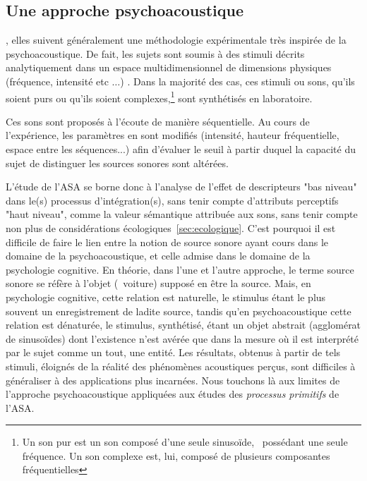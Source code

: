 \subsection{Une approche psychoacoustique}

, elles suivent généralement une méthodologie expérimentale très inspirée de la psychoacoustique. De fait, les sujets sont soumis à des stimuli décrits analytiquement dans un espace multidimensionnel de dimensions physiques (fréquence, intensité etc $\ldots$) \citep{dubois2006cognitive}. Dans la majorité des cas, ces stimuli ou sons, qu'ils soient purs ou qu'ils soient complexes,\footnote{Un son pur est un son composé d'une seule sinusoïde, \ie~possédant une seule fréquence. Un son complexe est, lui, composé de plusieurs composantes fréquentielles} sont synthétisés en laboratoire.

Ces sons sont proposés à l'écoute de manière séquentielle. Au cours de l'expérience, les paramètres en sont modifiés (intensité, hauteur fréquentielle, espace entre les séquences...) afin d'évaluer le seuil à partir duquel la capacité du sujet de distinguer les sources sonores sont altérées.

L'étude de l'ASA se borne donc à l'analyse de l'effet de descripteurs "bas niveau" dans le(s) processus d'intégration(s), sans tenir compte d'attributs perceptifs "haut niveau", comme la valeur sémantique attribuée aux sons, sans tenir compte non plus de considérations écologiques~\ref{sec:ecologique}. C'est pourquoi il est difficile de faire le lien entre la notion de source sonore ayant cours dans le domaine de la psychoacoustique, et celle admise dans le domaine de la psychologie cognitive. En théorie, dans l'une et l'autre approche, le terme source sonore se réfère à l'objet (\eg~voiture) supposé en être la source. Mais, en psychologie cognitive, cette relation est naturelle, le stimulus étant le plus souvent un enregistrement de ladite source, tandis qu'en psychoacoustique cette relation est dénaturée, le stimulus, synthétisé, étant un objet abstrait (agglomérat de sinusoïdes) dont l'existence n'est avérée que dans la mesure où il est interprété par le sujet comme un tout, une entité. Les résultats, obtenus à partir de tels stimuli, éloignés de la réalité des phénomènes acoustiques perçus, sont difficiles à généraliser à des applications plus incarnées. Nous touchons là aux limites de l'approche psychoacoustique appliquées aux études des \emph{processus primitifs} de l'ASA. 

